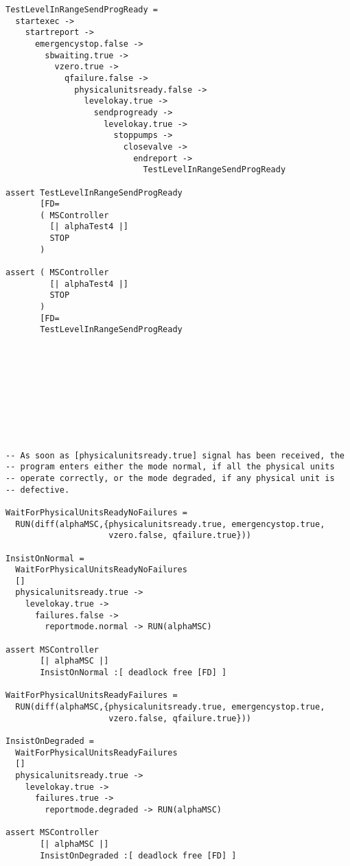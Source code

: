 \documentclass{report}
\begin{document}
\begin{verbatim}
TestLevelInRangeSendProgReady =
  startexec ->
    startreport ->
      emergencystop.false ->
        sbwaiting.true ->
          vzero.true ->
            qfailure.false ->
              physicalunitsready.false ->
                levelokay.true ->
                  sendprogready ->
                    levelokay.true ->
                      stoppumps ->
                        closevalve ->
                          endreport ->
                            TestLevelInRangeSendProgReady

assert TestLevelInRangeSendProgReady
       [FD=
       ( MSController
         [| alphaTest4 |]
         STOP
       )

assert ( MSController
         [| alphaTest4 |]
         STOP
       )
       [FD=
       TestLevelInRangeSendProgReady










-- As soon as [physicalunitsready.true] signal has been received, the
-- program enters either the mode normal, if all the physical units
-- operate correctly, or the mode degraded, if any physical unit is
-- defective.

WaitForPhysicalUnitsReadyNoFailures =
  RUN(diff(alphaMSC,{physicalunitsready.true, emergencystop.true,
                     vzero.false, qfailure.true}))

InsistOnNormal =
  WaitForPhysicalUnitsReadyNoFailures
  []
  physicalunitsready.true ->
    levelokay.true ->
      failures.false ->
        reportmode.normal -> RUN(alphaMSC)

assert MSController
       [| alphaMSC |]
       InsistOnNormal :[ deadlock free [FD] ]

WaitForPhysicalUnitsReadyFailures =
  RUN(diff(alphaMSC,{physicalunitsready.true, emergencystop.true,
                     vzero.false, qfailure.true}))

InsistOnDegraded =
  WaitForPhysicalUnitsReadyFailures
  []
  physicalunitsready.true ->
    levelokay.true ->
      failures.true ->
        reportmode.degraded -> RUN(alphaMSC)

assert MSController
       [| alphaMSC |]
       InsistOnDegraded :[ deadlock free [FD] ]
\end{verbatim}
\end{document}
